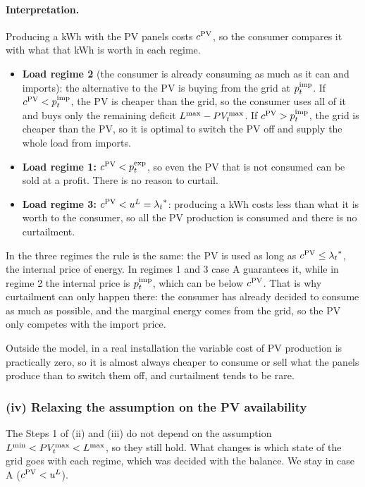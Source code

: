 \paragraph{Interpretation.}
Producing a kWh with the PV panels costs $c^{\mathrm{PV}}$, so the consumer compares it with what that
kWh is worth in each regime.
\begin{itemize}
    \item \textbf{Load regime 2} (the consumer is already consuming as much as it can and
    imports): the alternative to the PV is buying from the grid at $p^{\mathrm{imp}}_{t}$. If
    $c^{\mathrm{PV}} < p^{\mathrm{imp}}_{t}$, the PV is cheaper than the grid, so the consumer uses all of it and buys
    only the remaining deficit $L^{\max} - PV_{t}^{\max}$. If $c^{\mathrm{PV}} > p^{\mathrm{imp}}_{t}$, the grid is cheaper than
    the PV, so it is optimal to switch the PV off and supply the whole load from imports.
    \item \textbf{Load regime 1:} $c^{\mathrm{PV}} < p^{\mathrm{exp}}_{t}$, so even the PV that is not consumed can be
    sold at a profit. There is no reason to curtail.
    \item \textbf{Load regime 3:} $c^{\mathrm{PV}} < u^{L} = {\lambda_{t}}^*$: producing a kWh costs less than
    what it is worth to the consumer, so all the PV production is consumed and there is no
    curtailment.
\end{itemize}
In the three regimes the rule is the same: the PV is used as long as $c^{\mathrm{PV}} \leq {\lambda_{t}}^*$,
the internal price of energy. In regimes 1 and 3 case A guarantees it, while in regime 2 the
internal price is $p^{\mathrm{imp}}_{t}$, which can be below $c^{\mathrm{PV}}$. That is why curtailment can only happen
there: the consumer has already decided to consume as much as possible, and the marginal energy
comes from the grid, so the PV only competes with the import price.

Outside the model, in a real installation the variable cost of PV production is practically
zero, so it is almost always cheaper to consume or sell what the panels produce than to
switch them off, and curtailment tends to be rare.

\subsubsection{(iv) Relaxing the assumption on the PV availability}
The Steps 1 of (ii) and (iii) do not depend on the assumption $L^{\min} < PV_{t}^{\max} < L^{\max}$, so
they still hold. What changes is which state of the grid goes with each regime, which was
decided with the balance. We stay in case A ($c^{\mathrm{PV}} < u^{L}$).

